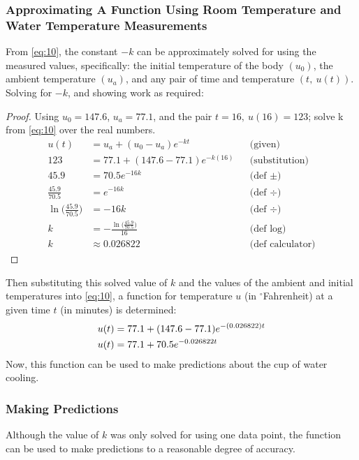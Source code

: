 \documentclass[10pt]{article}
\begin{document}
\subsubsection{Approximating A Function Using Room Temperature and Water Temperature Measurements}
From \eqref{eq:10}, the constant $-k$ can be approximately solved for using the measured values, specifically: the initial temperature of the  body $(u_0)$, the ambient temperature $(u_a)$, and any pair of time and temperature $(t,\ u(t))$. Solving for $-k$, and showing work as required:
	\begin{proof}
	Using $u_0 = 147.6$, $u_a = 77.1$, and the pair $t=16,\ u(16) = 123$; solve k from 				\eqref{eq:10} over the real numbers.
	\begin{align*}
		u(t) &= u_{a}+(u_0-u_{a}) e^{-kt} && \text{(given)} \\
		123 &= 77.1+(147.6-77.1) e^{-k(16)} && \text{(substitution)}\\
		45.9 &= 70.5e^{-16k} && \text{(def $\pm$)} \\
		\frac{45.9}{70.5} &= e^{-16k}  && \text{(def $\div$)}  \\
		\ln \bigg( \frac{45.9}{70.5} \bigg)&= -16k && \text{(def $\div$)} \\
		k &= -\frac{\ln \big( \frac{45.9}{70.5} \big)}{16}&& \text{(def log)} \\
		k &\approx 0.026822 && \text{(def calculator)} 
	\end{align*} 
	\end{proof}
Then substituting this solved value of $k$ and the values of the ambient and initial temperatures into \eqref{eq:10}, a function for temperature $u$ (in $^\circ$Fahrenheit) at a given time $t$ (in minutes) is determined:
	\begin{align}
	u(t) &= 77.1+(147.6-77.1) e^{-(0.026822)t} \notag \\
	u(t) &= 77.1+ 70.5 e^{-0.026822t} \label{eq:11}
	\end{align}
Now, this function can be used to make predictions about the cup of water cooling.

\subsubsection{Making Predictions}
Although the value of $k$ was only solved for using one data point, the function can be used to make predictions to a reasonable degree of accuracy.
\end{document}
